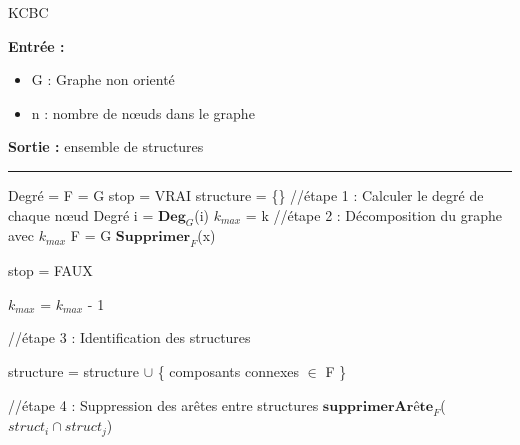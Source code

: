 \documentclass[a4paper,oneside,12pt]{report}
\theoremstyle{definition}
\begin{document}
\newpage

\label{KCBC}


\begin{algorithm}[H]
					\label{alg:KCBC}
					\caption{KCBC}
					\textbf{Entrée :}
						\begin{itemize}[label=$\bullet$]
							\item G : Graphe non orienté
							\item n : nombre de nœuds dans le graphe 
							
						\end{itemize}
					\textbf{Sortie :} ensemble de structures\\							\noindent\rule{\textwidth}{1pt}
						
						
				\begin{algorithmic} [1]
				\STATE Degré = 	\lbrack \rbrack
				\STATE F = G
				\STATE stop = VRAI
				\STATE structure = \{\}
				\STATE //étape 1 : Calculer le degré de chaque nœud
					  \STATE Degré \lbrack i \rbrack = $\textbf{Deg}_G$(i)
					  \ENDFOR
					  \STATE $k_{max}$ = k
						\STATE //étape 2 : Décomposition du graphe avec $k_{max}$
						\STATE F = G
							\STATE $\textbf{Supprimer}_F$(x) 
							\ENDIF
							
						\ENDFOR
						
							\STATE stop = FAUX
						
					\ELSE
						\STATE $k_{max}$ = $k_{max}$ - 1
					\ENDIF
					\ENDWHILE 
					
					
					\STATE //étape 3 : Identification des structures 
					
					\STATE structure = structure $\cup$ \{ composants connexes $ \in $ F \}
					 
					 \STATE //étape 4 : Suppression des arêtes entre structures
					 \STATE $\textbf{supprimerArête}_F$($struct_i \cap struct_j$)   
					 \ENDFOR
				\end{algorithmic}
			\end{algorithm}

\newpage






\end{document}
